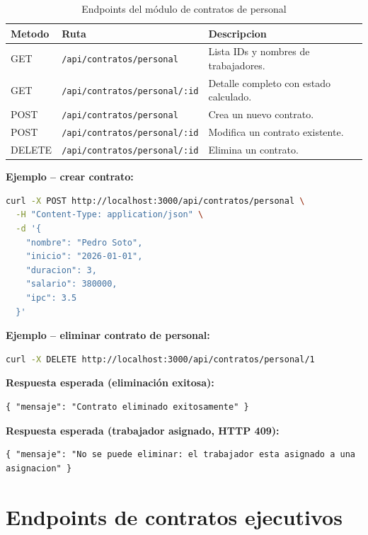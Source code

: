 \documentclass[12pt,a4paper]{report}
\begin{document}
\begin{longtable}{@{}p{1.5cm}p{4.5cm}p{6.5cm}@{}}
  \caption{Endpoints del módulo de contratos de personal} \\
  \toprule
  \textbf{Metodo} & \textbf{Ruta} & \textbf{Descripcion} \\
  \midrule
  \endfirsthead
  GET & \scriptsize\texttt{/api/contratos/personal} & Lista IDs y nombres de trabajadores. \\
  GET & \scriptsize\texttt{/api/contratos/personal/:id} & Detalle completo con estado calculado. \\
  POST & \scriptsize\texttt{/api/contratos/personal} & Crea un nuevo contrato. \\
  POST & \scriptsize\texttt{/api/contratos/personal/:id} & Modifica un contrato existente. \\
  DELETE & \scriptsize\texttt{/api/contratos/personal/:id} & Elimina un contrato. \\
  \bottomrule
\end{longtable}

\textbf{Ejemplo -- crear contrato:}
\begin{lstlisting}[language=bash]
curl -X POST http://localhost:3000/api/contratos/personal \
  -H "Content-Type: application/json" \
  -d '{
    "nombre": "Pedro Soto",
    "inicio": "2026-01-01",
    "duracion": 3,
    "salario": 380000,
    "ipc": 3.5
  }'
\end{lstlisting}

\textbf{Ejemplo -- eliminar contrato de personal:}
\begin{lstlisting}[language=bash]
curl -X DELETE http://localhost:3000/api/contratos/personal/1
\end{lstlisting}

\textbf{Respuesta esperada (eliminación exitosa):}
\begin{lstlisting}
{ "mensaje": "Contrato eliminado exitosamente" }
\end{lstlisting}

\textbf{Respuesta esperada (trabajador asignado, HTTP 409):}
\begin{lstlisting}
{ "mensaje": "No se puede eliminar: el trabajador esta asignado a una asignacion" }
\end{lstlisting}

\pagebreak
\section{Endpoints de contratos ejecutivos}
\end{document}
